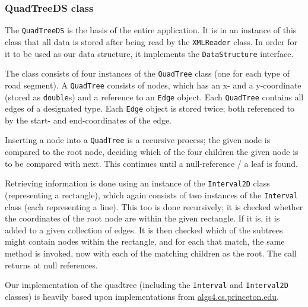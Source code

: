 \documentclass[a4paper,11pt]{article}
\begin{document}
\subsubsection{QuadTreeDS class} %
The \texttt{QuadTreeDS} is the basis of the entire application. It is in an instance of this class that all data is stored after being read by the \texttt{XMLReader} class. In order for it to be used as our data structure, it implements the \texttt{DataStructure} interface.

The class consists of four instances of the \texttt{QuadTree} class (one for each type of road segment). A \texttt{QuadTree} consists of nodes, which has an x- and a y-coordinate (stored as \texttt{double}s) and a reference to an \texttt{Edge} object. Each \texttt{QuadTree} contains all edges of a designated type. Each \texttt{Edge} object is stored twice; both referenced to by the start- and end-coordinates of the edge.

Inserting a node into a \texttt{QuadTree} is a recursive process; the given node is compared to the root node, deciding which of the four children the given node is to be compared with next. This continues until a null-reference / a leaf is found.

Retrieving information is done using an instance of the \texttt{Interval2D} class (representing a rectangle), which again consists of two instances of the \texttt{Interval} class (each representing a line). This too is done recursively; it is checked whether the coordinates of the root node are within the given rectangle. If it is, it is added to a given collection of edges. It is then checked which of the subtrees might contain nodes within the rectangle, and for each that match, the same method is invoked, now with each of the matching children as the root. The call returns at null references.

Our implementation of the quadtree (including the \texttt{Interval} and \texttt{Interval2D} classes) is heavily based upon implementations from \url{algs4.cs.princeton.edu}.
\\
\begin{figure}[!h]
\centering
{}
\end{figure}
\\
\end{document}
